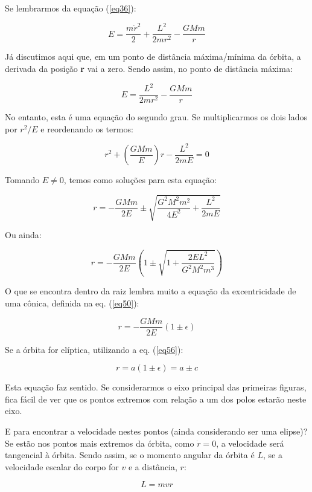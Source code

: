 Se lembrarmos da equação (\ref{eq36}):

\[
	E = \frac{m \dot{r}^2}{2} + \frac{L^2}{2mr^2} - \frac{GMm}{r}
\]

Já discutimos aqui que, em um ponto de distância máxima/mínima da órbita, a derivada da posição \textbf{r} vai a zero. Sendo assim, no ponto de distância máxima:

\[
	E = \frac{L^2}{2mr^2} - \frac{GMm}{r}
\]

No entanto, esta é uma equação do segundo grau. Se multiplicarmos os dois lados por $r^2 / E$ e reordenando os termos: 

\begin{equation}
	r^2 + \left(\frac{GMm}{E}\right)r - \frac{L^2}{2mE} = 0 	\label{eq66}
\end{equation}

Tomando $E \neq 0$, temos como soluções para esta equação:

\[
	r = - \frac{GMm}{2E} \pm \sqrt{\frac{G^2 M^2 m^2}{4E^2} + \frac{L^2}{2mE}}
\]

Ou ainda:

\[
	r = - \frac{GMm}{2E} \left(1 \pm \sqrt{1 + \frac{2EL^2}{G^2 M^2 m^3}} \right)
\]

O que se encontra dentro da raiz lembra muito a equação da excentricidade de uma cônica, definida na eq. (\ref{eq50}):

\begin{equation}
	r = - \frac{GMm}{2E}(1 \pm \epsilon)	\label{eq67}
\end{equation}

Se a órbita for elíptica, utilizando a eq. (\ref{eq56}):

\begin{equation}
	r = a(1 \pm \epsilon) = a \pm c	\label{eq68}
\end{equation}

Esta equação faz sentido. Se considerarmos o eixo principal das primeiras figuras, fica fácil de ver que os pontos extremos com relação a um dos polos estarão neste eixo.{\\}

E para encontrar a velocidade nestes pontos (ainda considerando ser uma elipse)? Se estão nos pontos mais extremos da órbita, como $\dot{r} = 0$, a velocidade será tangencial à órbita. Sendo assim, se o momento angular da órbita é $L$, se a velocidade escalar do corpo for $v$ e a distância, $r$:

\begin{equation}
	L = mvr			\label{eq69}
\end{equation}

